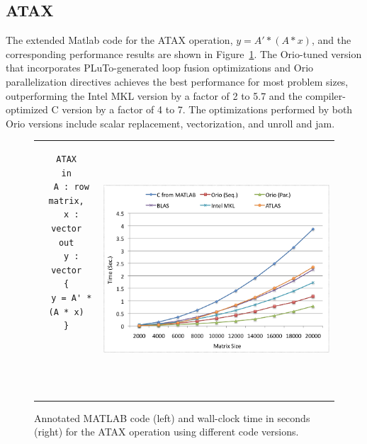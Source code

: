 \documentclass[11pt]{article}
\begin{document}
\subsection{ATAX}

The extended Matlab code for the ATAX operation, $y = A' * (A * x)$, and the corresponding performance results are shown in Figure~\ref{fig:atax}. The Orio-tuned version that incorporates PLuTo-generated loop fusion optimizations and Orio parallelization directives achieves the best performance for most problem sizes, outperforming the Intel MKL version by a factor of 2 to 5.7 and the compiler-optimized C version by a factor of 4 to 7. The optimizations performed by both Orio versions include scalar replacement, vectorization, and unroll and jam.



\begin{figure}[htp]
\centering
\begin{tabular}{cc}
\begin{minipage}[b]{.3\textwidth}
\footnotesize
\begin{verbatim}
ATAX
in
  A : row matrix,
  x : vector
out
  y : vector
{
  y = A' * (A * x)
}





\end{verbatim}
\end{minipage}
&
\begin{minipage}[b]{.6\textwidth}
\includegraphics[width=\textwidth]{figures/atax.png}
\end{minipage}\\
\end{tabular}
\caption{Annotated MATLAB code (left) and wall-clock time in seconds (right) for the ATAX operation using different code versions.}
\label{fig:atax}
\end{figure}
\end{document}
